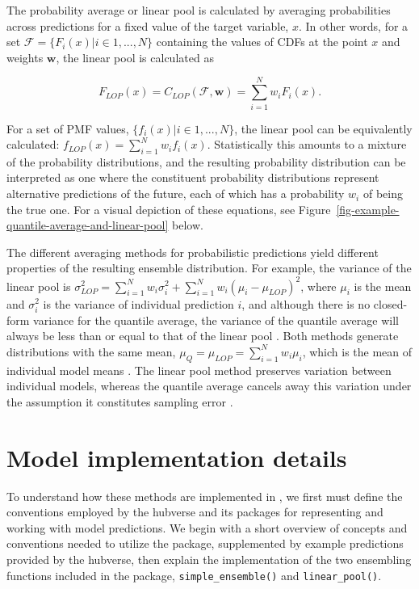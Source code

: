 \documentclass[
  article,
  shortnames,
  notitle]{jss}
\begin{document}
The probability average or linear pool is calculated by averaging
probabilities across predictions for a fixed value of the target
variable, \(x\). In other words, for a set
\(\mathcal{F} = \{F_i(x)| i \in 1,...,N \}\) containing the values of
CDFs at the point \(x\) and weights \(\pmb{w}\), the linear pool is
calculated as

\[
F_{LOP}(x) = C_{LOP}(\mathcal{F}, \pmb{w}) = \sum_{i = 1}^Nw_iF_i(x). 
\]

For a set of PMF values, \(\{f_i(x)|i \in 1, ..., N\}\), the linear pool
can be equivalently calculated:
\(f_{LOP}(x) = \sum_{i = 1}^N w_i f_i(x)\). Statistically this amounts
to a mixture of the probability distributions, and the resulting
probability distribution can be interpreted as one where the constituent
probability distributions represent alternative predictions of the
future, each of which has a probability \(w_i\) of being the true one.
For a visual depiction of these equations, see
Figure~\ref{fig-example-quantile-average-and-linear-pool} below.

The different averaging methods for probabilistic predictions yield
different properties of the resulting ensemble distribution. For
example, the variance of the linear pool is
\(\sigma^2_{LOP} = \sum_{i=1}^Nw_i\sigma_i^2 + \sum_{i=1}^Nw_i(\mu_i-\mu_{LOP})^2\),
where \(\mu_i\) is the mean and \(\sigma^2_i\) is the variance of
individual prediction \(i\), and although there is no closed-form
variance for the quantile average, the variance of the quantile average
will always be less than or equal to that of the linear pool
\citep{lichtendahl2013}. Both methods generate distributions with the
same mean, \(\mu_Q = \mu_{LOP} = \sum_{i=1}^Nw_i\mu_i\), which is the
mean of individual model means \citep{lichtendahl2013}. The linear pool
method preserves variation between individual models, whereas the
quantile average cancels away this variation under the assumption it
constitutes sampling error \citep{howerton2023}.

\section{Model implementation details}\label{sec-implementation}

To understand how these methods are implemented in ,
we first must define the conventions employed by the hubverse and its
packages for representing and working with model predictions. We begin
with a short overview of concepts and conventions needed to utilize the
 package, supplemented by example predictions provided
by the hubverse, then explain the implementation of the two ensembling
functions included in the package, \texttt{simple\_ensemble()} and
\texttt{linear\_pool()}.
\end{document}
